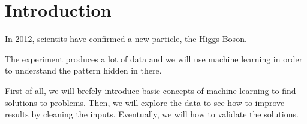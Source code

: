 \section{Introduction}

In 2012, scientits have confirmed a new particle, the Higgs Boson.

The experiment produces a lot of data and we will use machine learning in order to understand the pattern hidden in there.

First of all, we will brefely introduce basic concepts of machine learning to find solutions to problems. Then, we will explore the data to see how to improve results by cleaning the inputs. Eventually, we will how to validate the solutions.
